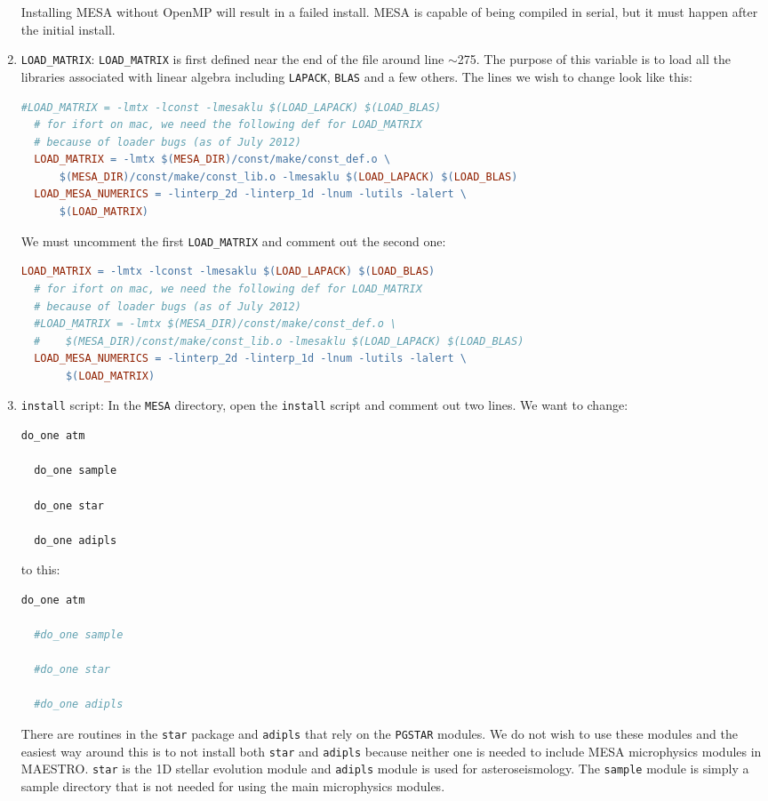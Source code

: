 \begin{enumerate}
Installing {\sf MESA} without OpenMP will result in a 
failed install. {\sf MESA} is capable of being compiled in serial, but it 
must happen after the initial install.

\item {\tt LOAD\_MATRIX}: {\tt LOAD\_MATRIX} is first defined near the end of 
the file around line $\sim$275. The purpose of this variable is to load all 
the libraries associated with linear algebra including {\tt LAPACK}, {\tt BLAS} 
and a few others. The lines we wish to change look like this:
\begin{lstlisting}[language=make,mathescape=false]
  #LOAD_MATRIX = -lmtx -lconst -lmesaklu $(LOAD_LAPACK) $(LOAD_BLAS)
  # for ifort on mac, we need the following def for LOAD_MATRIX 
  # because of loader bugs (as of July 2012)
  LOAD_MATRIX = -lmtx $(MESA_DIR)/const/make/const_def.o \
      $(MESA_DIR)/const/make/const_lib.o -lmesaklu $(LOAD_LAPACK) $(LOAD_BLAS)
  LOAD_MESA_NUMERICS = -linterp_2d -linterp_1d -lnum -lutils -lalert \
      $(LOAD_MATRIX)
\end{lstlisting}
We must uncomment the first {\tt LOAD\_MATRIX} and comment out the second one:
\begin{lstlisting}[language=make,mathescape=false]
  LOAD_MATRIX = -lmtx -lconst -lmesaklu $(LOAD_LAPACK) $(LOAD_BLAS)
  # for ifort on mac, we need the following def for LOAD_MATRIX 
  # because of loader bugs (as of July 2012)
  #LOAD_MATRIX = -lmtx $(MESA_DIR)/const/make/const_def.o \
  #    $(MESA_DIR)/const/make/const_lib.o -lmesaklu $(LOAD_LAPACK) $(LOAD_BLAS)
  LOAD_MESA_NUMERICS = -linterp_2d -linterp_1d -lnum -lutils -lalert \
       $(LOAD_MATRIX)
\end{lstlisting}

\item {\tt install} script: In the {\tt MESA} directory, open the {\tt install} 
script and comment out two lines. We want to change:
\begin{lstlisting}[language=bash,mathescape=false]
  do_one atm

  do_one sample

  do_one star

  do_one adipls
\end{lstlisting}
to this:
\begin{lstlisting}[language=bash,mathescape=false]
  do_one atm

  #do_one sample

  #do_one star

  #do_one adipls
\end{lstlisting}
There are routines in the {\tt star} package and {\tt adipls} that rely on 
the {\tt PGSTAR} modules. We do not wish to use these modules and the easiest 
way around this is to not install both {\tt star} and {\tt adipls} because 
neither one is needed to include {\sf MESA} microphysics modules in 
{\sf MAESTRO}. {\tt star} is the 1D stellar evolution module and {\tt adipls} 
module is used for asteroseismology. The {\tt sample} module is simply a 
sample directory that is not needed for using the main microphysics modules.


\end{enumerate}
